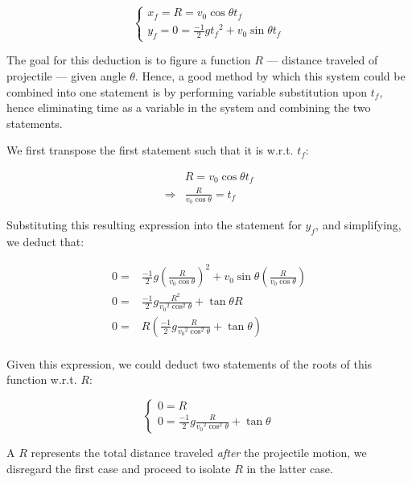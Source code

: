 \documentclass[letterpaper]{article}
\begin{document}
\begin{equation}
    \begin{cases}
        x_f = R = v_0\cos\theta t_f \\
        y_f = 0 = \frac{-1}{2}g{t_f}^2 + v_0\sin\theta t_f
    \end{cases}
\end{equation}

The goal for this deduction is to figure a function \(R\) --- distance traveled of projectile --- given angle \(\theta\). Hence, a good method by which this system could be combined into one statement is by performing variable substitution upon \(t_f\), hence eliminating time as a variable in the system and combining the two statements.

We first transpose the first statement such that it is w.r.t. \(t_f\):

\begin{align}
    &R = v_0 \cos\theta t_f \\
\Rightarrow &\frac{R}{v_0 \cos\theta} = t_f
\end{align}

Substituting this resulting expression into the statement for \(y_f\), and simplifying, we deduct that:

\begin{align}
    0 =& \frac{-1}{2}g(\frac{R}{v_0 \cos\theta})^2 + v_0 \sin\theta (\frac{R}{v_0 \cos\theta}) \\
    0 =& \frac{-1}{2}g\frac{R^2}{{v_0}^2 \cos^2\theta} + \tan\theta R \\
    0 =& R (\frac{-1}{2}g\frac{R}{{v_0}^2 \cos^2\theta} + \tan\theta) \\
\end{align}

Given this expression, we could deduct two statements of the roots of this function w.r.t. \(R\):

\begin{equation}
    \begin{cases}
        0 = R \\
        0 = \frac{-1}{2}g\frac{R}{{v_0}^2 \cos^2\theta} + \tan\theta
    \end{cases}
\end{equation}

A \(R\) represents the total distance traveled \emph{after} the projectile motion, we disregard the first case and proceed to isolate \(R\) in the latter case.
\end{document}
